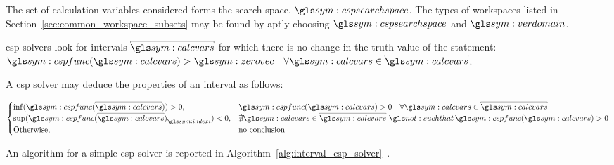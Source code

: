 				The set of calculation variables considered forms the search
				space, $\cspsearchspace$. The types of workspaces listed in
				Section~\ref{sec:common_workspace_subsets} may be found by aptly
				choosing $\cspsearchspace$ and $\verdomain$.


				\gls{csp} solvers look for intervals $\interval{\calcvars}$ for
				which there is no change in the truth value of the statement:
				\(
					\cspfunc(\calcvars)>\zerovec
						\quad\forall\calcvars\in\interval{\calcvars}
				\).

				A \gls{csp} solver may deduce the properties of an interval as
				follows:

				\begin{equation}
					\begin{cases}
						\inf(\cspfunc(\interval{\calcvars})) > 0, &
							\cspfunc(\calcvars) > 0
								\quad \forall\calcvars\in\interval{\calcvars}\\
						{\sup(\cspfunc(\interval{\calcvars})}_{\indexi}) < 0, &
							\nexists\calcvars\in\interval{\calcvars}\,\suchthat\,
								\cspfunc(\calcvars) > 0 \\
						\text{Otherwise}, & \text{no conclusion}
					\end{cases}
				\end{equation}

				An algorithm for a simple \gls{csp} solver is reported in
				Algorithm~\ref{alg:interval_csp_solver}~\cite{bib:cdpr:cable_driven_parallel_robots_theory_and_application}.

